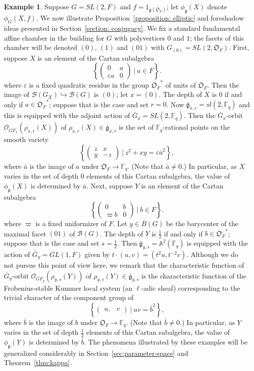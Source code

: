 \documentclass[11pt]{amsart}
\theoremstyle{definition}
\newtheorem{example}[theorem]{Example}
\theoremstyle{remark}
\numberwithin{equation}{theorem}
\def\F{{F}}
\def\A{{\mathfrak{O}_\F}}
\def\f{{\mathbb{F}_q}}
\def\GF{{G}}
\def\gF{{\mathfrak{g}}}
\def\orbint{{\phi}}
\def\orbit{{\mathcal{O}}}
\def\B{{\mathcal{B}}}
\begin{document}
\begin{example}
Suppose $\GF = SL(2,\F)$ and $f = 1_{\gF(\A)}$; let
$\orbint_\gF(X)$ denote $\orbint_\GF(X,f)$.  We now illustrate
Proposition~\ref{proposition: elliptic} and foreshadow ideas
presented in Section~\ref{section: conjugacy}.  We fix a standard
fundamental affine chamber in the building for $\GF$ with
polyvertices $0$ and $1$; the facets of this chamber will be
denoted $(0)$, $(1)$ and $(01)$ with $\GF_{(0)} = SL(2,\A)$.
First, suppose $X$ is an element of the Cartan subalgebra
\[
\left\{
\begin{pmatrix}
  0 & a \\
  \varepsilon a & 0
\end{pmatrix}
\ \vert\
a\in F
\right\}.
\]
where $\varepsilon$ is a fixed quadratic residue in the group
$\A^*$ of units of $\A$. Then the image of $\B(\GF_X)
\hookrightarrow \B(\GF)$ is ${(0)}$; let $x = (0)$. The depth of
$X$ is $0$ if and only if $a\in \A^*$; suppose that is the case
and set $r=0$. Now $\bar{\gF}_{x,r} = sl(2,\f)$ and this is
equipped with the adjoint action of $\bar{\GF}_x = SL(2,\f)$. Then
the $\bar{\GF}_x$-orbit $\orbit_{\bar{GF}_x}(\rho_{x,r}(X))$ of
$\rho_{x,r}(X)\in \bar{\gF}_{x,r}$ is the set of $\f$-rational
points on the smooth variety
\[
\left\{
\begin{pmatrix}
  z & x \\
  y & -z
\end{pmatrix}
\ \vert\
z^2+xy = \varepsilon \bar{a}^2
\right\},
\]
where $\bar{a}$ is the image of $a$ under $\A \to \f$. (Note that
$\bar{a} \ne 0$.) In particular, as $X$ varies in the set of depth
$0$ elements of this Cartan subalgebra, the value of
$\orbint_\gF(X)$ is determined by $\bar{a}$. Next, suppose $Y$ is
an element of the Cartan subalgebra
\[
\left\{
\begin{pmatrix}
  0 & b \\
  \varpi b & 0
\end{pmatrix}
\ \vert\
b\in F
\right\}.
\]
where $\varpi$ is a fixed uniformizer of $F$. Let $y\in B(\GF)$ be
the barycenter of the maximal facet $(01)$ of $\B(\GF)$. The depth
of $Y$ is $\frac{1}{2}$ if and only if $b \in \A^*$; suppose that is
the case and set $s= \frac{1}{2}$. Then $\bar{\gF}_{y,s} =
\mathbb{A}^2(\f)$ is equipped with the action of $\bar{\GF}_y =
GL(1,\F)$ given by $t\cdot(u,v) = (t^2u,t^{-2}v)$. Although we do
not pursue this point of view here, we remark that the
characteristic function of $\bar{\GF}_y$-orbit
$\orbit_{\bar{GF}_y}(\rho_{y,s}(Y))$ of $\rho_{y,s}(Y)\in
\bar{\gF}_{y,s}$ is the characteristic function of the
Frobenius-stable Kummer local system (an $\ell$-adic sheaf)
corresponding to the trivial character of the component group of
\[
\left\{
\begin{pmatrix}
  u, & v
\end{pmatrix}
\ \vert\
uv = \bar{b}^2
\right\},
\]
where $\bar{b}$ is the image of $b$ under $\A \to \f$. (Note that
$\bar{b} \ne 0$.) In particular, as $Y$ varies in the set of depth
$\frac{1}{2}$ elements of this Cartan subalgebra, the value of
$\orbint_\gF(Y)$ is determined by $\bar{b}$. The phenomena
illustrated by these examples will be generalized considerably in
Section~\ref{sec:parameter-space} and Theorem~\ref{thm:kappa}.
\end{example}
\end{document}
